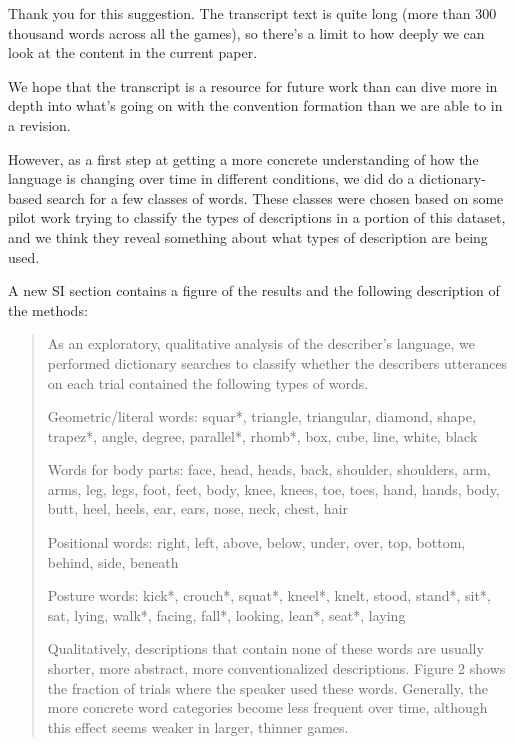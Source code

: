 \documentclass{stanfordletter}
\newcommand{\revised}[1]{\begin{quote}	#1 \end{quote}}
\begin{document}
\begin{letter}{}
          Thank you for this suggestion. The transcript text is quite long (more than 300 thousand words across all the games), so there's a limit to how deeply we can look at the content in the current paper. 
          
          We hope that the transcript is a resource for future work than can dive more in depth into what's going on with the convention formation than we are able to in a revision. 
          
          However, as a first step at getting a more concrete understanding of how the language is changing over time in different conditions, we did do a dictionary-based search for a few classes of words. These classes were chosen based on some pilot work trying to classify the types of descriptions in a portion of this dataset, and we think they reveal something about what types of description are being used. 
          
                    A new SI section contains a figure of the results and the following description of the methods:
          
          \revised{As an exploratory, qualitative analysis of the describer's language, we performed dictionary searches to classify whether the describers utterances on each trial contained the following types of words. 
          	
          	Geometric/literal words: squar*, triangle, triangular, diamond, shape, trapez*, angle, degree, parallel*, rhomb*, box, cube, line, white, black
          	
          	Words for body parts: face, head, heads, back, shoulder, shoulders, arm, arms, leg, legs, foot, feet, body, knee, knees, toe, toes, hand, hands, body, butt, heel, heels, ear, ears, nose, neck, chest, hair
          	
          	Positional words: right, left, above, below, under, over, top, bottom, behind, side, beneath
          	
          	Posture words: kick*, crouch*, squat*, kneel*, knelt, stood, stand*, sit*, sat, lying, walk*, facing, fall*, looking, lean*, seat*, laying
          	
          	Qualitatively, descriptions that contain none of these words are usually shorter, more abstract, more conventionalized descriptions. 
          	Figure 2 shows the fraction of trials where the speaker used these words. Generally, the more concrete word categories become less frequent over time, although this effect seems weaker in larger, thinner games. }
          	

\end{letter}
\end{document}

